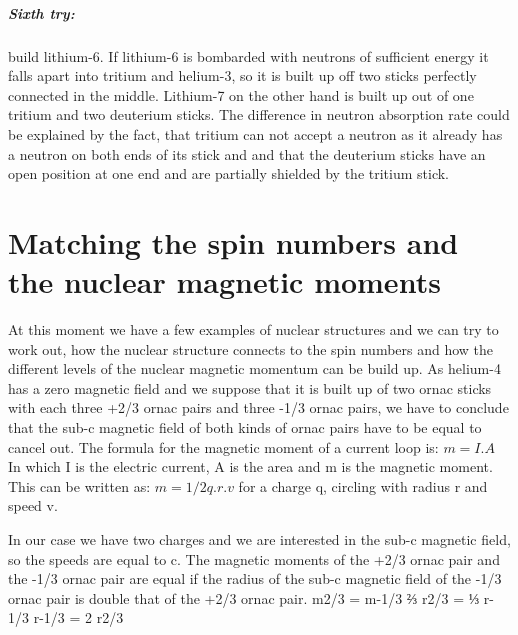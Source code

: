 \subparagraph{Sixth try:} 
build lithium-6. If lithium-6 is bombarded with neutrons of sufficient energy it falls apart into tritium and helium-3, so it is built up off two sticks perfectly connected in the middle. Lithium-7 on the other hand is built up out of one tritium and two deuterium sticks. The difference in neutron absorption rate could be explained by the fact, that tritium can not accept a neutron as it already has a neutron on both ends of its stick and and that the deuterium sticks have an open position at one end and are partially shielded by the tritium stick.

\section{Matching the spin numbers and the nuclear magnetic moments}

At this moment we have a few examples of nuclear structures and we can try to work out, how the nuclear structure connects to the spin numbers and how the different levels of the nuclear magnetic momentum can be build up.
As helium-4 has a zero magnetic field and we suppose that it is built up of two ornac sticks with each three +2/3 ornac pairs and three -1/3 ornac pairs, we have to conclude that the sub-c magnetic field of both kinds of ornac pairs have to be equal to cancel out. The formula for the magnetic moment of a current loop is:
$m =  I.A$
In which I is the electric current, A is the area and m is the magnetic moment. This can be written as:
$m = 1/2 q.r.v$
for a charge q, circling with radius r and speed v.

In our case we have two charges and we are interested in the sub-c magnetic field, so the speeds are equal to c. The magnetic moments of the +2/3 ornac pair and the -1/3 ornac pair are equal if the radius of the sub-c magnetic field of the -1/3 ornac pair is double that of the +2/3 ornac pair.
m2/3 = m-1/3
⅔ r2/3 = ⅓ r-1/3
r-1/3 = 2 r2/3

